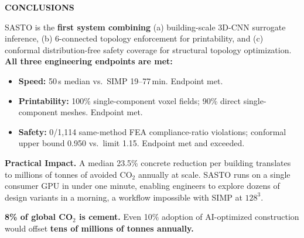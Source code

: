 \documentclass[10pt]{article}
\newenvironment{ccard}{%
  \begin{tcolorbox}[
    colback=cardfill, colframe=cardbdr,
    boxrule=0.5pt, arc=4pt, outer arc=4pt,
    left=3.5mm, right=3.5mm, top=2.5mm, bottom=2.5mm,
    width=\linewidth
  ]%
}{%
  \end{tcolorbox}%
}
\newcommand{\sechdr}[1]{%
  \begin{tcolorbox}[
    colback=secbar, colframe=secbar,
    boxrule=0pt, arc=3pt,
    left=4mm, right=4mm, top=1.5mm, bottom=1.5mm,
    width=\linewidth
  ]
    \centering\color{white}\fontsize{24pt}{26pt}\selectfont\bfseries
    \MakeUppercase{#1}
  \end{tcolorbox}%
  \vspace{1.5mm}%
}
\newlength{\RC}  \setlength{\RC} {29.72cm}
\newlength{\SG}  \setlength{\SG} {1.5mm}
\begin{document}
\begin{minipage}[t]{\RC}
\sechdr{Conclusions}
\begin{ccard}
  \small\RaggedRight
  SASTO is the \textbf{first system combining} (a) building-scale 3D-CNN
  surrogate inference, (b) 6-connected topology enforcement for printability,
  and (c) conformal distribution-free safety coverage for structural topology
  optimization.\\[4pt]
  \textbf{All three engineering endpoints are met:}
  \begin{itemize}[leftmargin=1.2em, itemsep=3pt, topsep=2pt]
    \item \textbf{Speed:} 50\,s median vs.\ SIMP 19--77\,min.
      {\color{teal}Endpoint met.}
    \item \textbf{Printability:} 100\% single-component voxel fields; 90\%
      direct single-component meshes. {\color{teal}Endpoint met.}
    \item \textbf{Safety:} 0/1,114 same-method FEA compliance-ratio
      violations; conformal upper bound 0.950 vs.\ limit 1.15.
      {\color{teal}Endpoint met and exceeded.}
  \end{itemize}

  \vspace{3mm}
  \textbf{Practical Impact.}
  A median 23.5\% concrete reduction per building translates to millions of
  tonnes of avoided CO$_2$ annually at scale. SASTO runs on a single consumer
  GPU in under one minute, enabling engineers to explore dozens of design
  variants in a morning, a workflow impossible with SIMP at $128^3$.

  \vspace{2mm}
  \begin{tcolorbox}[colback=teal!12,colframe=teal,arc=4pt,
    left=3mm,right=3mm,top=2mm,bottom=2mm,width=\linewidth]
    \small\color{txtdark}
    \textbf{8\% of global CO$_2$ is cement.}
    Even 10\% adoption of AI-optimized construction would offset
    \textbf{tens of millions of tonnes annually.}
  \end{tcolorbox}
\end{ccard}
\vspace{\SG}


\end{minipage}
\end{document}
